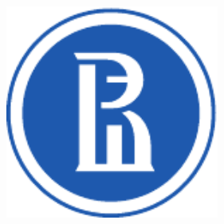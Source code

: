 \documentclass[a0,portrait]{a0poster}
\begin{document}
\begin{minipage}[b]{0.25\linewidth}
\begin{minipage}[b]{0.49\linewidth}
\begin{center}
  \end{center}
  \end{minipage}
  \begin{minipage}[b]{0.49\linewidth}
  \begin{center}
    \centering
    \includegraphics[width=7cm]{pics/logos/hse.pdf}
  \end{center}
  \end{minipage}
\end{minipage}

\large

\end{document}
